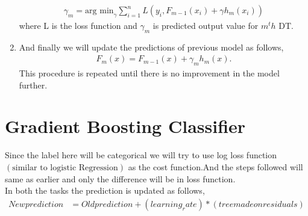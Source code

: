 \documentclass[journal,12pt,onecolumn]{IEEEtran}
\providecommand{\brak}[1]{\ensuremath{\left(#1\right)}}
\theoremstyle{remark}
\numberwithin{equation}{section}
\begin{document}
\begin{enumerate}
			  \begin{align}
                            \gamma_m = \text{arg min}_\gamma \sum_{i=1}^n L(y_i,F_{m-1}(x_i) + \gamma h_m(x_i))
                          \end{align}
				  where L is the loss function and $\gamma_m$ is predicted output value for $m^th$ DT.
		   \item And finally we will update the predictions of previous model as follows,
			   \begin{align}
			     F_{m}(x)=F_{{m-1}}(x)+\gamma _{m}h_{m}(x).
		           \end{align}
		This procedure is repeated until there is no improvement in the model further.
		  \end{enumerate}
		  \section{Gradient Boosting Classifier}
                   Since the label here will be categorical we will try to use log loss function$(\text{similar to logistic Regression})$ as the cost function.And the steps followed will same as earlier and only the difference will be in loss function.\\
		   In both the tasks the prediction is updated as follows,
		     \begin{align}
			     Newprediction &= Oldprediction + \brak{learning_rate}*\brak{tree made on residuals}
		     \end{align}
	     
\end{document}
